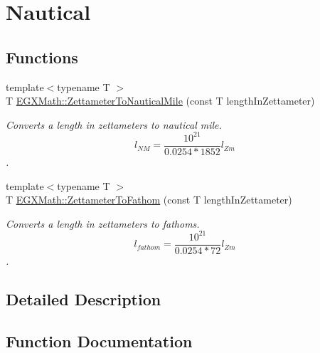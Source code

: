 \hypertarget{group___e_g_x_math-_conversions-_length_conversions-_zettameter-_nautical}{}\section{Nautical}
\label{group___e_g_x_math-_conversions-_length_conversions-_zettameter-_nautical}
\subsection*{Functions}
\begin{DoxyCompactItemize}
\item 
{\footnotesize template$<$typename T $>$ }\\T \mbox{\hyperlink{group___e_g_x_math-_conversions-_length_conversions-_zettameter-_nautical_ga474eb2cb88740b3dd9e13fa6e8aa4558}{E\+G\+X\+Math\+::\+Zettameter\+To\+Nautical\+Mile}} (const T length\+In\+Zettameter)
\begin{DoxyCompactList}\small\item\em Converts a length in zettameters to nautical mile. \[ l_{NM}= \frac{10^{21}}{0.0254 * 1852} l_{Zm} \]. \end{DoxyCompactList}\item 
{\footnotesize template$<$typename T $>$ }\\T \mbox{\hyperlink{group___e_g_x_math-_conversions-_length_conversions-_zettameter-_nautical_ga44aa79d0db3ed37a2e2f4800467008c2}{E\+G\+X\+Math\+::\+Zettameter\+To\+Fathom}} (const T length\+In\+Zettameter)
\begin{DoxyCompactList}\small\item\em Converts a length in zettameters to fathoms. \[ l_{fathom}= \frac{10^{21}}{0.0254 * 72} l_{Zm} \]. \end{DoxyCompactList}\end{DoxyCompactItemize}


\subsection{Detailed Description}


\subsection{Function Documentation}
\mbox{\label{group___e_g_x_math-_conversions-_length_conversions-_zettameter-_nautical_ga44aa79d0db3ed37a2e2f4800467008c2}} 
